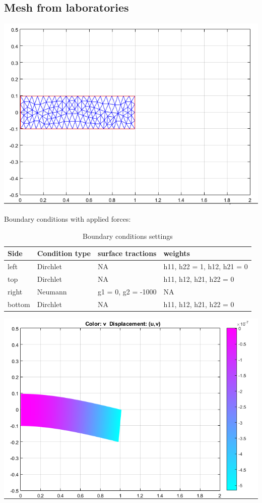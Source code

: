 \documentclass[a4paper,12pt]{article}
\begin{document}
\subsection{Mesh from laboratories}
\centerline{\includegraphics[scale=0.7]{meshFromLabs}}

Boundary conditions with applied forces: 
\begin{table}[H]
\centering
\begin{tabular}{|l|l|l|l|}
\hline 
Side  & Condition type & surface tractions & weights \\ \hline 
left  & Dirchlet & NA & h11, h22 = 1, h12, h21 = 0 \\ \hline 
top   & Dirchlet & NA & h11, h12, h21, h22 = 0 \\ \hline
right & Neumann  & g1 = 0, g2 = -1000 & NA \\ \hline
bottom   & Dirchlet & NA & h11, h12, h21, h22 = 0 \\ \hline

\end{tabular}
\caption{Boundary conditions settings}
\end{table}

\centerline{\includegraphics[scale=0.7]{resultFromLabs}}
\end{document}
